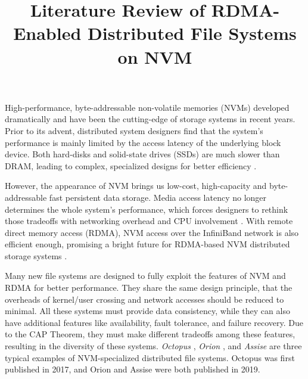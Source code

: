 
\begin{survey}
\label{cha:survey}

\title{Literature Review of RDMA-Enabled Distributed File Systems on NVM}
\maketitle

High-performance, byte-addressable non-volatile memories (NVMs) developed dramatically and have been the cutting-edge of storage systems in recent years. Prior to its advent, distributed system designers find that the system’s performance is mainly limited by the access latency of the underlying block device. Both hard-disks and solid-state drives (SSDs) are much slower than DRAM, leading to complex, specialized designs for better efficiency \cite{sorion2019}.

However, the appearance of NVM brings us low-cost, high-capacity and byte-addressable fast persistent data storage. Media access latency no longer determines the whole system’s performance, which forces designers to rethink those tradeoffs with networking overhead and CPU involvement \cite{sorion2019}. With remote direct memory access (RDMA), NVM access over the InfiniBand network is also efficient enough, promising a bright future for RDMA-based NVM distributed storage systems \cite{sassise2019}.

Many new file systems are designed to fully exploit the features of NVM and RDMA for better performance. They share the same design principle, that the overheads of kernel/user crossing and network accesses should be reduced to minimal. All these systems must provide data consistency, while they can also have additional features like availability, fault tolerance, and failure recovery. Due to the CAP Theorem, they must make different tradeoffs among these features, resulting in the diversity of these systems. {\em Octopus} \cite{soctopus2017}, {\em Orion} \cite{sorion2019}, and {\em Assise} \cite{sassise2019} are three typical examples of NVM-specialized distributed file systems. Octopus was first published in 2017, and Orion and Assise were both published in 2019.


\end{survey}

